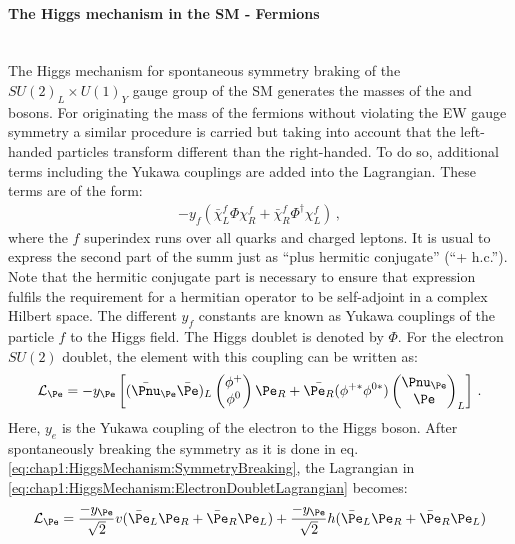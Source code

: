 \paragraph{The Higgs mechanism in the SM - Fermions}\mbox{}\\ %
The Higgs mechanism for spontaneous symmetry braking of the $SU(2)_{L} \times U(1)_{Y}$ gauge group of the SM generates the masses of the \PWpm and \PZ bosons.
For originating the mass of the fermions without violating the EW gauge symmetry a similar procedure is carried but taking into account that the left-handed particles transform different
than the right-handed. To do so, additional terms including the Yukawa couplings are added into the Lagrangian. These terms are of the form:
\begin{align*}
-y_{f}(\bar{\chi}_{L}^f \Phi \chi_{R}^{f} + \bar{\chi}_{R}^f \Phi^{\dagger} \chi_{L}^{f} )\, ,
\end{align*}
where the $f$  superindex runs over all quarks and charged leptons. It is usual to express the second part of the summ just as ``plus hermitic conjugate'' (``+ h.c.''). Note that the hermitic conjugate part
is necessary to ensure that expression fulfils the requirement for a hermitian operator to be self-adjoint in a complex Hilbert space.
The different $y_f$ constants are known as Yukawa couplings of the particle $f$ to the Higgs field. The Higgs doublet is denoted by $\Phi$.
For the electron $SU(2)$ doublet, the element with this coupling can be written as:
\begin{equation}\label{eq:chap1:HiggsMechanism:ElectronDoubletLagrangian}
\mathcal{L}_{\Pe} = - y_{\Pe} \left[ (\bar{\Pnu}_{\Pe} \bar{\Pe})_{L} \begin{pmatrix}  \phi^{+} \\ \phi^{0}  \end{pmatrix} \Pe_{R} +  \bar{\Pe_{R}}  (\phi^{+*} \phi^{0*})\begin{pmatrix}  \Pnu_{\Pe} \\ \Pe  \end{pmatrix}_{L} \right] \, .
\end{equation}
Here, $y_{e}$ is the Yukawa coupling of the electron to the Higgs boson. 
After spontaneously breaking the symmetry as it is done 
in eq. \ref{eq:chap1:HiggsMechanism:SymmetryBreaking}, the Lagrangian in \ref{eq:chap1:HiggsMechanism:ElectronDoubletLagrangian} becomes:
\begin{equation}\label{eq:chap1:HiggsMechanism:ElectronBroken}
\mathcal{L}_{\Pe} = \frac{-y_{\Pe}}{\sqrt{2}} v (\bar{\Pe}_{L}\Pe_{R} + \bar{\Pe}_{R}\Pe_{L}) +  \frac{-y_{\Pe}}{\sqrt{2}} h (\bar{\Pe}_{L}\Pe_{R} + \bar{\Pe}_{R}\Pe_{L} )
\end{equation}
